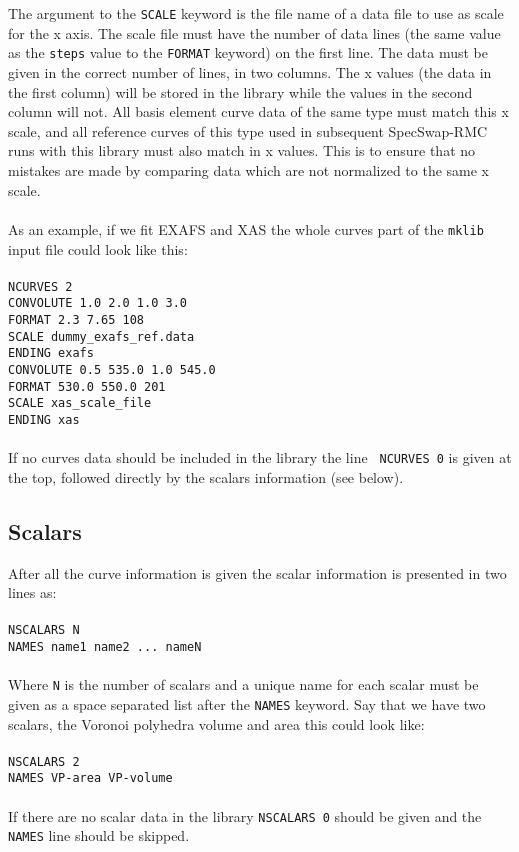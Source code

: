 \documentclass[a4paper, 10pt]{article}
\begin{document}
\\\\
The argument to the {\tt SCALE} keyword is the file name of a data
file to use as scale for the x axis. The scale file must have the
number of data lines (the same value as the {\tt steps} value to the
{\tt FORMAT} keyword) on the first line. The data must be given in the
correct number of lines, in two columns. The x values (the data in the first column)
will be stored in the library while the values in the second column
will not.
All basis element curve data of the
same type must match this x scale, and all reference curves of this
type used in subsequent SpecSwap-RMC runs with this library must also
match in x values. This is to ensure that no mistakes are made by
comparing data which are not normalized to the same x scale.
\\\\
As an example, if we fit EXAFS and XAS the whole curves part of the
{\tt mklib} input file could look like this:
\\\\
{\tt NCURVES 2}\\
{\tt CONVOLUTE 1.0 2.0 1.0 3.0}\\
{\tt FORMAT 2.3 7.65 108}\\
{\tt SCALE dummy\_exafs\_ref.data}\\
{\tt ENDING exafs}\\
{\tt CONVOLUTE 0.5 535.0 1.0 545.0}\\
{\tt FORMAT 530.0 550.0 201}\\
{\tt SCALE xas\_scale\_file}\\
{\tt ENDING xas}\\\\
If no curves data should be included in the library the line {\tt
  NCURVES 0} is given at the top, followed directly by the scalars information
(see below).

\subsection{Scalars}
After all the curve information is given the scalar information is
presented in two lines as:\\\\
{\tt NSCALARS N}\\
{\tt NAMES name1 name2 ... nameN}\\\\
Where {\tt N} is the number of scalars and a unique name for each
scalar must be given as a space separated list after the {\tt NAMES}
keyword. Say that we have two scalars, the Voronoi polyhedra volume
and area this could look like:
\\\\
{\tt NSCALARS 2}\\
{\tt NAMES VP-area VP-volume}\\\\
If there are no scalar data in the library {\tt NSCALARS 0} should be
given and the {\tt NAMES} line should be skipped.
\end{document}
